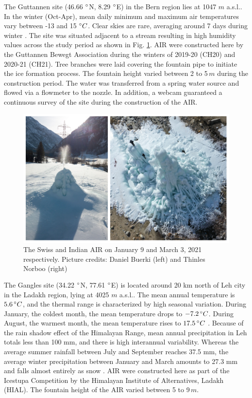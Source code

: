 \documentclass[utf8]{frontiersSCNS}
\begin{document}
The Guttannen site (46.66 $\degree$N, 8.29 $\degree$E) in the Bern region lies at 1047 $m$ a.s.l.. In the winter
(Oct-Apr), mean daily minimum and maximum air temperatures vary between -13 and 15 $\degree C$. Clear skies are
rare, averaging around 7 days during winter \citep{guttannen}. The site was situated adjacent to a stream
resulting in high humidity values across the study period as shown in Fig. \ref{fig:2AIR}. AIR were constructed
here by the Guttannen Bewegt Association during the winters of 2019-20 (CH20) and 2020-21 (CH21). Tree branches
were laid covering the fountain pipe to initiate the ice formation process. The fountain height varied between 2
to 5\,$m$ during the construction period. The water was transferred from a spring water source and flowed via a
flowmeter to the nozzle. In addition, a webcam guaranteed a continuous survey of the site during the
construction of the AIR.

\begin{figure}
	\begin{center}
		\includegraphics[width=12 cm]{Figures/Figure_2.jpg}
	\end{center}
	\caption{The Swiss and Indian AIR on January 9 and March 3, 2021 respectively. Picture credits: Daniel Buerki (left)
		and Thinles Norboo (right)}
	\label{fig:2AIR}
\end{figure}

The Gangles site (34.22 $\degree$N, 77.61 $\degree$E) is located around 20 km north of Leh city in the Ladakh
region, lying at 4025 $m$ a.s.l.. The mean annual temperature is $5.6 \, \degree C$, and the thermal range is
characterized by high seasonal variation. During January, the coldest month, the mean temperature drops to $-7.2
\, \degree C$. During August, the warmest month, the mean temperature rises to $17.5 \, \degree C$
\citep{Nusser_2012}. Because of the rain shadow effect of the Himalayan Range, mean annual precipitation in Leh
totals less than 100 mm, and there is high interannual variability. Whereas the average summer rainfall between
July and September reaches 37.5 mm, the average winter precipitation between January and March amounts to 27.3
mm and falls almost entirely as snow .  AIR were constructed here as part of the Icestupa Competition  by the
Himalayan Institute of Alternatives, Ladakh (HIAL). The fountain height of the AIR varied between 5 to 9\,$m$.
\end{document}
